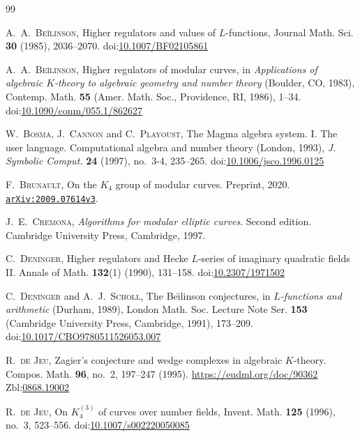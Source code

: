 \documentclass[11pt,a4,leqno]{amsart}
\theoremstyle{my theoremstyle}
\theoremstyle{dfn}
\theoremstyle{remark}
\renewcommand{\1}{\mathbbm{1}}
\numberwithin{equation}{section}
\begin{document}
\begin{thebibliography}{99}

\textsc{A.~A.~Be\u ilinson},
Higher regulators and values of $L$-functions,
Journal Math. Sci. {\bf 30} (1985), 2036--2070.
doi:\href{https://doi.org/10.1007/BF02105861}{10.1007/BF02105861}

\textsc{A.~A.~Be\u ilinson},
Higher regulators of modular curves,
in \emph{Applications of algebraic $K$-theory to algebraic geometry and number theory} (Boulder, CO, 1983),
Contemp. Math. \textbf{55} (Amer. Math. Soc., Providence, RI, 1986), 1--34.
doi:\href{https://doi.org/10.1090/conm/055.1/862627}{10.1090/conm/055.1/862627}

\textsc{W.~Bosma}, \textsc{J.~Cannon} and \textsc{C.~Playoust},
The {M}agma algebra system. {I}. {T}he user language. Computational algebra and number theory (London, 1993),
\emph{J. Symbolic Comput.} \textbf{24} (1997), no.~3-4, 235--265.
doi:\href{https://doi.org/10.1006/jsco.1996.0125}{10.1006/jsco.1996.0125}

\textsc{F.~Brunault},
On the $K_4$ group of modular curves. Preprint, 2020. \href{https://arxiv.org/abs/2009.07614v3}{\texttt{arXiv:2009.07614v3}}. 

\textsc{J.~E.~Cremona},
\emph{Algorithms for modular elliptic curves}.
Second edition.
Cambridge University Press, Cambridge, 1997.

\textsc{C.~Deninger},
Higher regulators and Hecke $L$-series of imaginary quadratic
fields II. Annals of Math. \textbf{132}(1) (1990), 131--158.
doi:\href{https://doi.org/10.2307/1971502}{10.2307/1971502}

\textsc{C.~Deninger} and \textsc{A.~J.~Scholl},
The Be\u\i linson conjectures,
in \emph{$L$-functions and arithmetic} (Durham, 1989),
London Math. Soc. Lecture Note Ser. \textbf{153} (Cambridge University Press, Cambridge, 1991), 173--209.
doi:\href{https://doi.org/10.1017/CBO9780511526053.007}{10.1017/CBO9780511526053.007}

\textsc{R.~de Jeu},
Zagier’s conjecture and wedge complexes in algebraic $K$-theory.
Compos. Math. \textbf{96}, no.~2, 197--247 (1995). 
\url{https://eudml.org/doc/90362} Zbl:\href{https://zbmath.org/0868.19002}{0868.19002}

\textsc{R.~de Jeu},
On $K_4^{(3)}$ of curves over number fields,
Invent. Math. \textbf{125} (1996), no.~3, 523--556. 
doi:\href{https://doi.org/10.1007/s002220050085}{10.1007/s002220050085}


\end{thebibliography}
\end{document}
